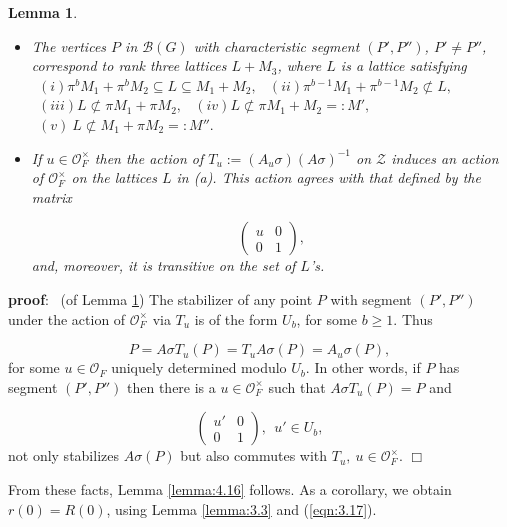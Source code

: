 \documentclass[12pt,letterpaper]{amsart}
\numberwithin{equation}{section}
\newtheorem{lemma}[theorem]{Lemma}
\theoremstyle{definition}
\theoremstyle{plain}
\providecommand{\cal}{\mathcal}
\def\zz{{\cal Z}}
\def\pf{{\bf proof}:\ }
\def\qed{$\Box$}
\def\off{{\cal O}_F}
\def\bbg{{\cal B}(G)}
\begin{document}
\begin{lemma}
\label{lemma:4.18}

\begin{itemize}
\item[(a)] 
The vertices $P$ in $\bbg$ with characteristic segment $(P',P'')$,
$P' \not= P''$, correspond to rank three lattices
$L+M_3$, where $L$ is a lattice satisfying
\newline
$\ \ (i) \pi^bM_1 +\pi^bM_2 \subseteq L \subseteq M_1+M_2,$
\newline
$\ \ (ii) \pi^{b-1}M_1 + \pi^{b-1}M_2 \not\subset L,$
\newline
$\ \ (iii) L \not\subset \pi M_1+\pi M_2,$
\newline
$\ \ (iv)  L \not\subset \pi M_1+ M_2 =:M',$
\newline
$\ \ (v) \  L \not\subset  M_1+\pi M_2=:M''.$
\newline

\item[(b)] 
If $u\in \off^{\times}$ then the action of 
$T_u := (A_u\sigma )(A\sigma )^{-1}$ on $\zz$ induces an action of 
$\off^{\times}$ on the lattices $L$ in (a). This action agrees with
that defined by the matrix

\[
\left(
\begin{array}{cc}
u&0\\0&1 
\end{array}
\right),
\]
and, moreover, it is transitive on the set of $L$'s.
\end{itemize}
\end{lemma}

\pf
(of Lemma \ref{lemma:4.18})
The stabilizer of any point $P$ with segment $(P',P'')$ under the action of 
$\off^{\times}$ via $T_u$ is of the form $U_b$, for some $b\geq 1$. Thus

\begin{equation}
\label{eqn:4.19}
P=A\sigma T_u(P)=T_uA\sigma (P)=A_u\sigma (P),
\end{equation}
for some $u\in\off$ uniquely determined modulo $U_b$. In other words, if $P$ 
has segment $(P',P'')$ then there is a $u\in \off^{\times}$ such that
$A\sigma T_u (P)=P$ and

\[
\left(
\begin{array}{cc}
u'&0\\0&1 \end{array}
\right),\ \ u'\in U_b,
\]
not only stabilizes $A\sigma (P)$ but also commutes with $T_u, \ u\in
\off^{\times}$. 
\qed

From these facts, Lemma \ref{lemma:4.16} follows. 
As a corollary, we obtain $r(0)=R(0)$,
using Lemma \ref{lemma:3.3} and (\ref{eqn:3.17}).
\end{document}
